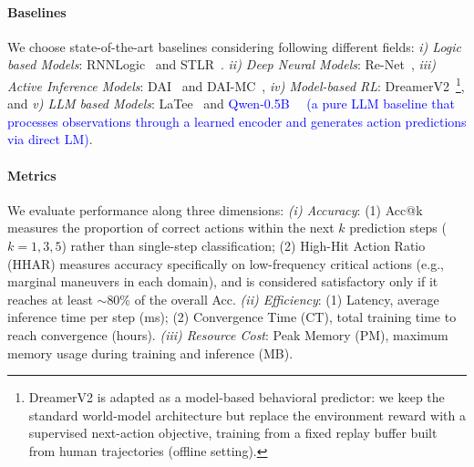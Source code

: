 \documentclass{article} %
\newcommand{\revise}[1]{\textcolor{blue}{#1}}
\begin{document}
\paragraph{Baselines} We choose state-of-the-art baselines considering following different fields: {\it i) Logic based Models}: RNNLogic~\citep{qu2020rnnlogic} and STLR~\citep{cao2023discovering}. {\it ii) Deep Neural Models}: Re-Net~\citep{jin2019recurrent}, {\it iii) Active Inference Models}: DAI~\citep{ccatal2020learning} and DAI-MC~\citep{fountas2020deep}, {\it iv) Model-based RL}: DreamerV2~\citep{hafner2020mastering}\revise{\footnote{DreamerV2 is adapted as a model-based behavioral predictor: we keep the standard world-model architecture but replace the environment reward with a supervised next-action objective, training from a fixed replay buffer built from human trajectories (offline setting).}}, and {\it v) LLM based Models}: LaTee~\citep{song2024latent} and \revise{Qwen-0.5B~\citep{qwen2.5}~\cite{qwen2} (a pure LLM baseline that processes observations through a learned encoder and generates action predictions via direct LM)}.

\paragraph{Metrics} 
We evaluate performance along three dimensions:  
{\it (i) Accuracy}: (1) Acc@k measures the proportion of correct actions within the next $k$ prediction steps 
($k{=}1,3,5$) rather than single-step classification; 
(2) High-Hit Action Ratio (HHAR) measures accuracy specifically on low-frequency critical actions 
(e.g., marginal maneuvers in each domain), and is considered satisfactory only if it reaches at least 
$\sim$80\% of the overall Acc.  
{\it (ii) Efficiency}: (1) Latency, average inference time per step (ms); 
(2) Convergence Time (CT), total training time to reach convergence (hours).  
{\it (iii) Resource Cost}: Peak Memory (PM), maximum memory usage during training and inference (MB).
\end{document}
